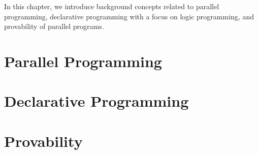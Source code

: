 In this chapter, we introduce background concepts related to parallel
programming, declarative programming with a focus on logic programming, and
provability of parallel programs.

\section{Parallel Programming}


\section{Declarative Programming}


\section{Provability}

